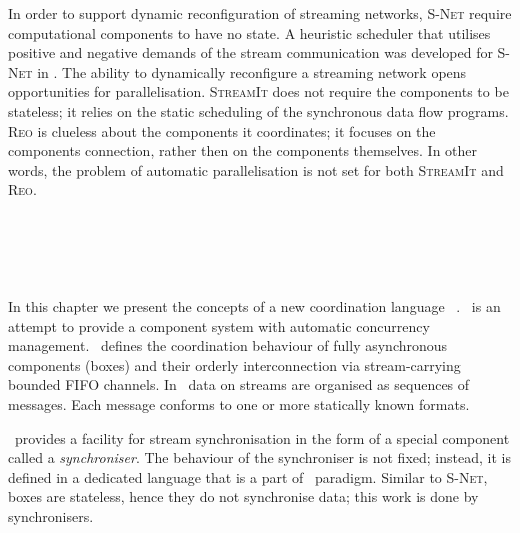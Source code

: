 In order to support dynamic reconfiguration of streaming networks, \textsc{S-Net} require computational components to have no state. A heuristic scheduler that utilises positive and negative demands of the stream communication was developed for \textsc{S-Net} in \cite{nga}. The ability to dynamically reconfigure a streaming network opens opportunities for parallelisation. \textsc{StreamIt} does not require the components to be stateless; it relies on the static scheduling of the synchronous data flow programs. \textsc{Reo} is clueless about the components it coordinates; it focuses on the components connection, rather then on the components themselves. In other words, the problem of automatic parallelisation is not set for both \textsc{StreamIt} and \textsc{Reo}.
%
%



\chapter{\ak\ }
In this chapter we present the concepts of a new coordination language \ak\ . \ak\ is an attempt to provide a component system with automatic concurrency management. \ak\ defines the coordination behaviour of fully asynchronous components (boxes) and their orderly interconnection via stream-carrying bounded FIFO channels. In \ak\, data on streams are organised as sequences of messages. Each message conforms to one or more statically known formats.

\ak\ provides a facility for stream synchronisation in the form of a special component called a \emph{synchroniser}. The behaviour of the synchroniser is not fixed; instead, it is defined in a dedicated language that is a part of \ak\ paradigm. Similar to \textsc{S-Net}, boxes are stateless, hence they do not synchronise data; this work is done by synchronisers.

